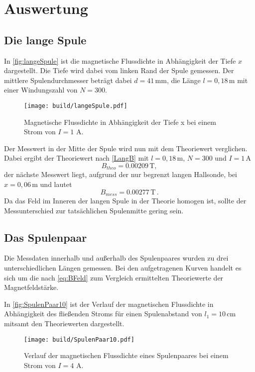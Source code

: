 \section{Auswertung}
\label{sec:Auswertung}

\subsection{Die lange Spule}
\label{sec:langeSpule}
In \autoref{fig:langeSpule} ist die magnetische Flussdichte in Abhängigkeit der Tiefe $x$ dargestellt. Die Tiefe
wird dabei vom linken Rand der Spule gemessen. Der mittlere Spulendurchmesser beträgt dabei $d=41 \, \unit{\milli\meter}$, 
die Länge $l=0,18 \, \unit{\meter}$ mit einer Windungszahl von $N=300$.
\begin{figure}[H]
    \centering
    \texttt{[image: build/langeSpule.pdf]}
    \caption{Magnetische Flussdichte in Abhängigkeit der Tiefe x bei einem Strom von $I= 1 \, \, \unit{\ampere}$.}
    \label{fig:langeSpule}
  \end{figure}

Der Messwert in der Mitte der Spule wird nun mit dem Theoriewert verglichen.
Dabei ergibt der Theoriewert nach \eqref{LangB} mit $l=0,18 \, \unit{\meter}$, $N=300$ und $I= 1\, \unit{\ampere}$
\begin{equation*}
  B_{theo}= 0.00209 \, \unit{\tesla},
\end{equation*}
der nächste Messwert liegt, aufgrund der nur begrenzt langen Hallsonde, bei $x=0,06\, \unit{\meter}$ und lautet
\begin{equation*}
  B_{mess} = 0.00277 \, \unit{\tesla}\,.
\end{equation*}
Da das Feld im Inneren der langen Spule in der Theorie homogen ist, sollte der Messunterschied zur tatsächlichen Spulenmitte
gering sein. 

\newpage

\subsection{Das Spulenpaar}
\label{sec:Spulenpaar}
Die Messdaten innerhalb und außerhalb des Spulenpaares wurden zu drei unterschiedlichen Längen gemessen. 
Bei den aufgetragenen Kurven handelt es sich um die nach \eqref{eq:BFeld} zum Vergleich ermittelten Theoriewerte
der Magnetfeldstärke.

In \autoref{fig:SpulenPaar10} ist der Verlauf der magnetischen Flussdichte in Abhängigkeit des fließenden Stroms
für einen Spulenabstand von $l_1= 10 \, \unit{\centi\meter}$ mitsamt den Theoriewerten dargestellt.
  \begin{figure}[H]
    \centering
    \texttt{[image: build/SpulenPaar10.pdf]}
    \caption{Verlauf der magnetischen Flussdichte eines Spulenpaares bei einem Strom von $I= 4 \, \, \unit{\ampere}$.}
    \label{fig:SpulenPaar10}
  \end{figure}

